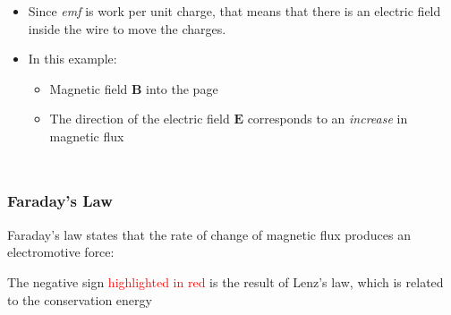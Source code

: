 \documentclass[12pt,aspectratio=169]{beamer}
\newcommand{\mb}[1]{\mathbf{#1}}
\newcommand{\eq}[2]{\vspace{#1}{\Large\begin{displaymath}#2\end{displaymath}}}
\begin{document}
\begin{frame}
\begin{columns}
    \begin{itemize}
    \item Since \emph{emf} is work per unit charge, that means that there is an
      electric field inside the wire to move the charges.
    \item In this example:
      \begin{itemize}
      \item Magnetic field $\mb{B}$ into the page
      \item The direction of the electric field $\mb{E}$ corresponds to an
        \emph{increase} in magnetic flux
      \end{itemize}
    \end{itemize}
  \end{columns}
\end{frame}


\begin{frame}
  \frametitle{Faraday's Law}
  Faraday's law states that the rate of change of magnetic flux produces an
  electromotive force:

  \eq{-.3in}{
    \boxed{
      \mathcal{E}=\oint\mb{E}\cdot d\mb{l}={\color{red}{-}}\frac{d\Phi}{dt}
    }
  }
  
  The negative sign {\textcolor{red}{highlighted in red}} is the result of
  Lenz's law, which is related to the conservation energy
\end{frame}




\end{document}
